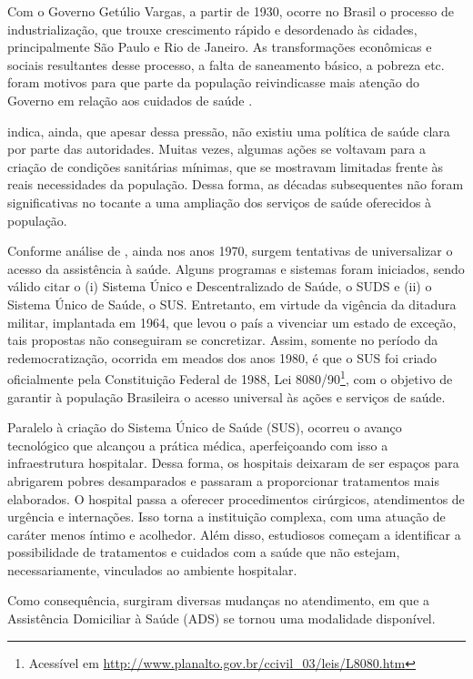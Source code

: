 Com o Governo Getúlio Vargas, a partir de 1930, ocorre no Brasil o processo de
industrialização, que trouxe crescimento rápido e desordenado às cidades,
principalmente São Paulo e Rio de Janeiro. As transformações econômicas e
sociais resultantes desse processo, a falta de saneamento básico, a pobreza etc.
foram motivos para que parte da população reivindicasse mais atenção do Governo
em relação aos cuidados de saúde \cite{carvalho1984}.

 indica, ainda, que apesar dessa pressão, não existiu
uma política de saúde clara por parte das autoridades. Muitas vezes, algumas
ações se voltavam para a criação de condições sanitárias mínimas, que se
mostravam limitadas frente às reais necessidades da população. Dessa forma, as
décadas subsequentes não foram significativas no tocante a uma ampliação dos
serviços de saúde oferecidos à população.

Conforme análise de , ainda nos anos 1970, surgem
tentativas de universalizar o acesso da assistência à saúde. Alguns programas e
sistemas foram iniciados, sendo válido citar o (i) Sistema Único e
Descentralizado de Saúde, o SUDS e (ii) o Sistema Único de Saúde, o SUS.
Entretanto, em virtude da vigência da ditadura militar, implantada em 1964, que
levou o país a vivenciar um estado de exceção, tais propostas não conseguiram se
concretizar. Assim, somente no período da redemocratização, ocorrida em meados
dos anos 1980, é que o SUS foi criado oficialmente pela Constituição Federal de
1988, Lei 8080/90\footnote{Acessível em
\url{http://www.planalto.gov.br/ccivil_03/leis/L8080.htm}}, com o  objetivo de
garantir à população Brasileira o acesso universal às ações e  serviços de
saúde.

Paralelo à criação do Sistema Único de Saúde (SUS), ocorreu o avanço
tecnológico que alcançou a prática médica, aperfeiçoando com isso a
infraestrutura hospitalar. Dessa forma, os hospitais deixaram de ser espaços
para abrigarem pobres desamparados e passaram a proporcionar tratamentos mais
elaborados. O hospital passa a oferecer  procedimentos cirúrgicos, atendimentos
de urgência e internações. Isso torna a instituição complexa, com uma atuação de
caráter menos íntimo e acolhedor. Além disso, estudiosos começam a identificar
a possibilidade de tratamentos e cuidados com a  saúde que não estejam,
necessariamente, vinculados ao ambiente hospitalar.

Como consequência, surgiram diversas mudanças no atendimento, em que a Assistência
Domiciliar à Saúde (ADS) se tornou uma modalidade disponível.

